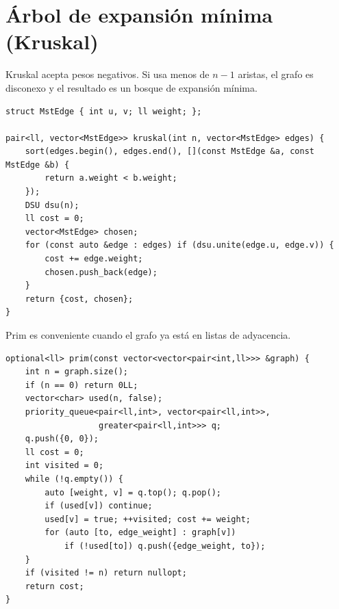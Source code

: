 \section{\'Arbol de expansi\'on m\'inima (Kruskal)}

Kruskal acepta pesos negativos. Si usa menos de $n-1$ aristas, el grafo es
disconexo y el resultado es un bosque de expansi\'on m\'inima.

\begin{lstlisting}[style=cpp]
struct MstEdge { int u, v; ll weight; };

pair<ll, vector<MstEdge>> kruskal(int n, vector<MstEdge> edges) {
    sort(edges.begin(), edges.end(), [](const MstEdge &a, const MstEdge &b) {
        return a.weight < b.weight;
    });
    DSU dsu(n);
    ll cost = 0;
    vector<MstEdge> chosen;
    for (const auto &edge : edges) if (dsu.unite(edge.u, edge.v)) {
        cost += edge.weight;
        chosen.push_back(edge);
    }
    return {cost, chosen};
}
\end{lstlisting}


Prim es conveniente cuando el grafo ya est\'a en listas de adyacencia.

\begin{lstlisting}[style=cpp]
optional<ll> prim(const vector<vector<pair<int,ll>>> &graph) {
    int n = graph.size();
    if (n == 0) return 0LL;
    vector<char> used(n, false);
    priority_queue<pair<ll,int>, vector<pair<ll,int>>,
                   greater<pair<ll,int>>> q;
    q.push({0, 0});
    ll cost = 0;
    int visited = 0;
    while (!q.empty()) {
        auto [weight, v] = q.top(); q.pop();
        if (used[v]) continue;
        used[v] = true; ++visited; cost += weight;
        for (auto [to, edge_weight] : graph[v])
            if (!used[to]) q.push({edge_weight, to});
    }
    if (visited != n) return nullopt;
    return cost;
}
\end{lstlisting}

